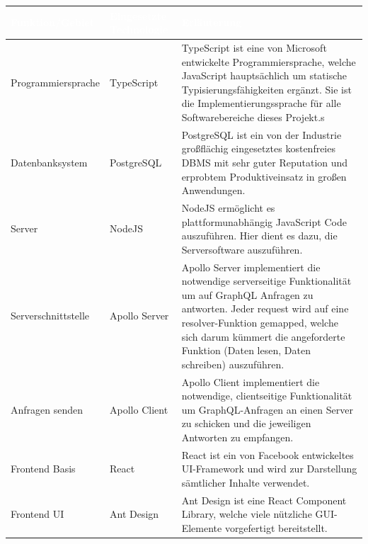 \documentclass[a4paper,12pt]{article}
\begin{document}
\begin{center}
      \begin{tabular}{|m{4cm}|m{2.5cm}|m{8.5cm}|}
            \hline
        \rowcolor{TUMBlue} \textcolor{white}{\textbf{Funktion/Gebiet}} & \textcolor{white}{\textbf{Eingesetzte Technologie}} & \textcolor{white}{\textbf{Erläuterung}} \\
        \hline
        Programmiersprache & TypeScript & TypeScript ist eine von Microsoft entwickelte Programmiersprache, welche JavaScript hauptsächlich um statische Typisierungsfähigkeiten ergänzt. Sie ist die Implementierungssprache für alle Softwarebereiche dieses Projekt.s \\
        \hline
        Datenbanksystem & PostgreSQL & PostgreSQL ist ein von der Industrie großflächig eingesetztes kostenfreies DBMS mit sehr guter Reputation und erprobtem Produktiveinsatz in großen Anwendungen. \\
        \hline
        Server & NodeJS & NodeJS ermöglicht es plattformunabhängig JavaScript Code auszuführen. Hier dient es dazu, die Serversoftware auszuführen. \\
        \hline
        Serverschnittstelle & Apollo Server & Apollo Server implementiert die notwendige serverseitige Funktionalität um auf GraphQL Anfragen zu antworten. Jeder request wird auf eine resolver-Funktion gemapped, welche sich darum kümmert die angeforderte Funktion (Daten lesen, Daten schreiben) auszuführen. \\
        \hline
        Anfragen senden & Apollo Client & Apollo Client implementiert die notwendige, clientseitige Funktionalität um GraphQL-Anfragen an einen Server zu schicken und die jeweiligen Antworten zu empfangen. \\
        \hline
        Frontend Basis & React & React ist ein von Facebook entwickeltes UI-Framework und wird zur Darstellung sämtlicher Inhalte verwendet. \\
        \hline
        Frontend UI & Ant Design & Ant Design ist eine React Component Library, welche viele nützliche GUI-Elemente vorgefertigt bereitstellt. \\
        \hline
      \end{tabular}
\end{center}
\end{document}
